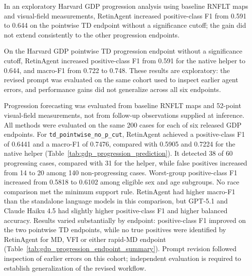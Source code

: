 
In an exploratory Harvard GDP progression analysis using baseline RNFLT maps
and visual-field measurements, RetinAgent increased positive-class F1 from
0.591 to 0.644 on the pointwise TD endpoint without a significance cutoff;
the gain did not extend consistently to the other progression endpoints.

On the Harvard GDP pointwise TD progression endpoint without a significance
cutoff, RetinAgent increased positive-class F1 from 0.591 for the native helper
to 0.644, and macro-F1 from 0.722 to 0.748. These results are exploratory:
the revised prompt was evaluated on the same cohort used to inspect earlier
agent errors, and performance gains did not generalize across all six endpoints.

Progression forecasting was evaluated from baseline RNFLT maps and 52-point
visual-field measurements, not from follow-up observations supplied at inference.
All methods were evaluated on the same 200 cases for each of six released GDP
endpoints. For \texttt{td\_pointwise\_no\_p\_cut}, RetinAgent achieved a
positive-class F1 of 0.6441 and a macro-F1 of 0.7476, compared with 0.5905 and
0.7224 for the native helper (Table~\ref{tab:gdp_progression_prediction}).
It detected 38 of 60 progressing cases, compared with 31 for the helper, while
false positives increased from 14 to 20 among 140 non-progressing cases.
Worst-group positive-class F1 increased from 0.5818 to 0.6102 among eligible
sex and age subgroups. No race comparison met the minimum support rule.
RetinAgent had
higher macro-F1 than the standalone language models in this comparison, but
GPT-5.1 and Claude Haiku 4.5 had slightly higher positive-class F1 and higher
balanced accuracy. Results varied substantially by endpoint: positive-class
F1 improved on the two pointwise TD endpoints, while no true positives were
identified by RetinAgent for MD, VFI or either rapid-MD endpoint
(Table~\ref{tab:gdp_progression_endpoint_summary}). Prompt revision followed
inspection of earlier errors on this cohort; independent evaluation is required
to establish generalization of the revised workflow.

